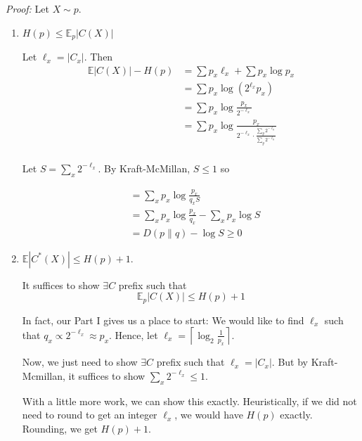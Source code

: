 \documentclass[12pt]{report}
\newcommand{\E}{\mathbb{E}}
\newcommand{\abs}[1]{\left\vert #1 \right\vert}
\DeclareMathOperator*{\argmin}{\arg\min}
\newenvironment*{tbox}[2][gray]{
    \begin{tcolorbox}[
        parbox=false,
        colback=#1!5!white,
        colframe=#1!75!black,
        breakable,
        title={#2}
    ]}
    {\end{tcolorbox}}
\begin{document}
\begin{tbox}{\textbf{Theorem:} Let $\vec X \sim \vec p$. For the optimal code $C^* = \argmin_{C \text{ prefix}} \E_{\vec p} [\abs{C(X)}]$,
        \[H(\vec p) \leq \abs{\E_{\vec p}} C^*(X) \leq H(\vec p ) + 1\]}
    \emph{Proof:} Let $X \sim p$.

    \begin{enumerate}
        \item $H(p) \leq \E_p \abs{C(X)}$

              Let $\ell_x = \abs{C_x}$. Then
              \begin{align*}
                  \E\abs{C(X)} - H(p) & = \sum p_x \ell_x + \sum p_x \log p_x                                                       \\
                                      & =  \sum p_x \log(2^{\ell_x} p_x)                                                            \\
                                      & = \sum p_x \log \frac{p_x}{2^{-\ell_x}}                                                     \\
                                      & = \sum p_x \log \frac{p_x}{2^{-\ell_x} \cdot \frac{\sum_y 2^{-\ell_y}}{\sum_y 2^{-\ell_y}}} \\
              \end{align*}

              Let $S = \sum_x 2^{-\ell_x}$. By Kraft-McMillan, $S \leq 1$ so

              \begin{align}
                   & = \sum_x p_x \log \frac{p_x}{q_x S}                   \\
                   & = \sum_x p_x \log \frac{p_x}{q_x} - \sum_x p_x \log S \\
                   & = D(p \parallel q) - \log S \geq 0
              \end{align}

        \item $\E\abs{C^*(X)} \leq H(p) + 1$.

              It suffices to show $\exists C$ prefix such that
              \[\E_p\abs{C(X)} \leq H(p) + 1\]

              In fact, our Part I gives us a place to start: We would like to find $\ell_x$ such that $q_x \propto 2^{-\ell_x} \approx p_x$. Hence, let $\ell_x = \left\lceil \log_2 \frac{1}{p_x} \right\rceil$.

              Now, we just need to show $\exists C$ prefix such that $\ell_x = \abs{C_x}$. But by Kraft-Mcmillan, it suffices to show $\sum_x 2^{-\ell_x} \leq 1$.

              With a little more work, we can show this exactly. Heuristically, if we did not need to round to get an integer $\ell_x$, we would have $H(p)$ exactly. Rounding, we get $H(p) + 1$.
    \end{enumerate}
\end{tbox}
\end{document}

